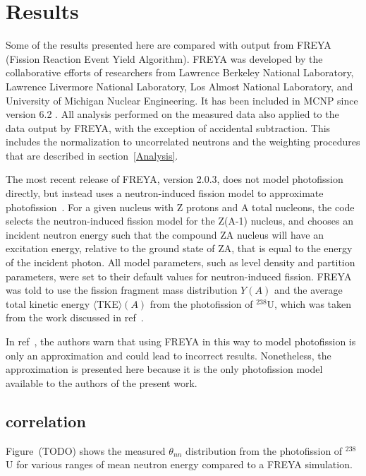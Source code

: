 \chapter{Results}
Some of the results presented here are compared with output from FREYA (Fission Reaction Event Yield Algorithm). 
FREYA was developed by the collaborative efforts of researchers from Lawrence Berkeley National Laboratory,  Lawrence Livermore National Laboratory, Los Almost National Laboratory, and University of Michigan Nuclear Engineering.
It has been included in MCNP since version 6.2 .
All analysis performed on the measured data also applied to the data output by FREYA, with the exception of accidental subtraction.
This includes the normalization to uncorrelated neutrons and the weighting procedures that are described in section~\ref{Analysis}.
 
The most recent release of FREYA, version 2.0.3, does not model photofission directly, but instead uses a neutron-induced fission model to approximate photofission~\cite{FREYA_photofission}.
For a given nucleus with Z protons and A total nucleons, the code selects the neutron-induced fission model for the Z(A-1) nucleus, and chooses an incident neutron energy such that the compound ZA nucleus will have an excitation energy, relative to the ground state of ZA, that is equal to the energy of the incident photon.
All model parameters, such as level density and partition parameters, were set to their default values for neutron-induced fission.
FREYA was told to use the fission fragment mass distribution $Y(A)$ and the average total kinetic energy $\langle$TKE$\rangle(A)$ from the photofission of $^{238}$U, which was taken from the work discussed in ref~\cite{2017Krishichayan}.

In ref~\cite{Talou2018}, the authors warn that using FREYA in this way to model photofission is only an approximation and could lead to incorrect results.
Nonetheless, the approximation is presented here because it is the only photofission model available to the authors of the present work.

\section{correlation}
Figure~(TODO) shows the measured $\theta_{nn}$ distribution from the photofission of $^{238}$U for various ranges of mean neutron energy compared to a FREYA simulation.

